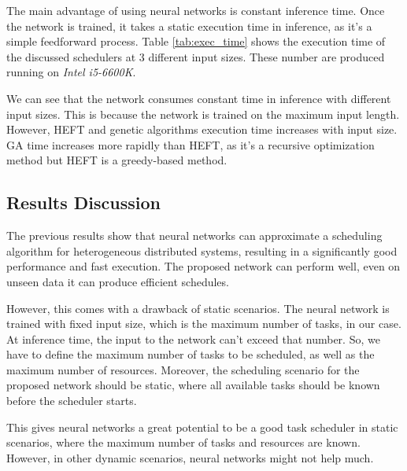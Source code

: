 The main advantage of using neural networks is constant inference time. Once the network is trained, it takes a static execution time in inference, as it's a simple feedforward process. Table \ref{tab:exec_time} shows the execution time of the discussed schedulers at 3 different input sizes. These number are produced running on \emph{Intel i5-6600K}. 

We can see that the network consumes constant time in inference with different input sizes. This is because the network is trained on the maximum input length. However, HEFT and genetic algorithms execution time increases with input size. GA time increases more rapidly than HEFT, as it's a recursive optimization method but HEFT is a greedy-based method.

\subsection{Results Discussion}
The previous results show that neural networks can approximate a scheduling algorithm for heterogeneous distributed systems, resulting in a significantly good performance and fast execution. The proposed network can perform well, even on unseen data it can produce efficient schedules.

However, this comes with a drawback of static scenarios. The neural network is trained with fixed input size, which is the maximum number of tasks, in our case. At inference time, the input to the network can't exceed that number. So, we have to define the maximum number of tasks to be scheduled, as well as the maximum number of resources. Moreover, the scheduling scenario for the proposed network should be static, where all available tasks should be known before the scheduler starts. 

This gives neural networks a great potential to be a good task scheduler in static scenarios, where the maximum number of tasks and resources are known. However, in other dynamic scenarios, neural networks might not help much. 